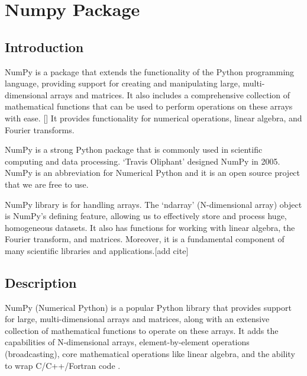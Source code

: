 %
%

\chapter{Numpy Package}


\section{Introduction}

NumPy is a package that extends the functionality of the Python programming language, providing support for creating and manipulating large, multi-dimensional arrays and matrices. It also includes a comprehensive collection of mathematical functions that can be used to perform operations on these arrays with ease. [\cite{Harris:2020}] It provides functionality for numerical operations, linear algebra, and Fourier transforms.

NumPy is a strong Python package that is commonly used in scientific computing and data processing. ‘Travis Oliphant’ designed NumPy in 2005. NumPy is an abbreviation for Numerical Python and it is an open source project that we are free to use. 

NumPy library is for handling arrays. The ‘ndarray’ (N-dimensional array) object is NumPy's defining feature, allowing us to effectively store and process huge, homogeneous datasets. It also has functions for working with linear algebra, the Fourier transform, and matrices. Moreover, it is a fundamental component of many scientific libraries and applications.[add cite]

\section{Description }
NumPy (Numerical Python) is a popular Python library that provides support for large, multi-dimensional arrays and matrices, along with an extensive collection of mathematical functions to operate on these arrays. It adds the capabilities of N-dimensional arrays, element-by-element operations (broadcasting), core mathematical operations like linear algebra, and the ability to wrap C/C++/Fortran code \cite{Harris:2020}.


